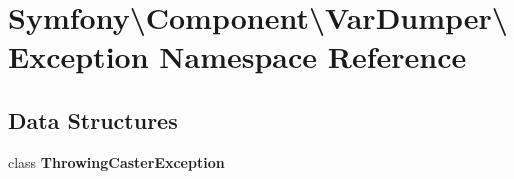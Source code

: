 \section{Symfony\textbackslash{}Component\textbackslash{}Var\+Dumper\textbackslash{}Exception Namespace Reference}
\label{namespace_symfony_1_1_component_1_1_var_dumper_1_1_exception}
\subsection*{Data Structures}
\begin{DoxyCompactItemize}
\item 
class {\bf Throwing\+Caster\+Exception}
\end{DoxyCompactItemize}
